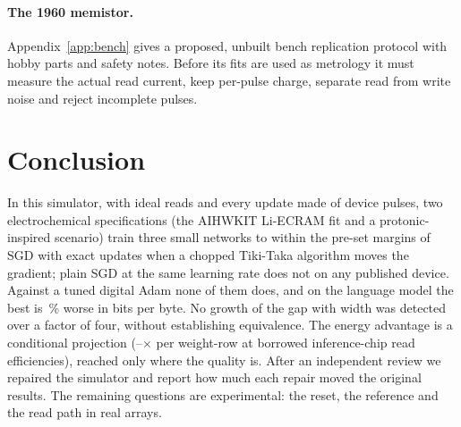 \paragraph{The 1960 memistor.} Appendix~\ref{app:bench} gives a proposed, unbuilt bench replication protocol with hobby parts and
safety notes. Before its fits are used as metrology it must measure the actual read current, keep per-pulse charge, separate
read from write noise and reject incomplete pulses.

\section{Conclusion}
In this simulator, with ideal reads and every update made of device pulses, two electrochemical specifications (the AIHWKIT
Li-ECRAM fit and a protonic-inspired scenario) train three small networks to within the pre-set margins of SGD with exact updates
when a chopped Tiki-Taka algorithm moves the gradient; plain SGD at the same learning rate does not on any published device. Against
a tuned digital Adam none of them does, and on the language model the best is \RVLmAdamBestGap\,\% worse in bits per byte. No
growth of the gap with width was detected over a factor of four, without establishing equivalence. The energy advantage is a
conditional projection (\RVenSysMin--\RVenChipMax$\times$ per weight-row at borrowed inference-chip read efficiencies), reached
only where the quality is. After an independent review we repaired the simulator and report how much each repair moved the
original results. The remaining questions are experimental: the reset, the reference and the read path in real arrays.
